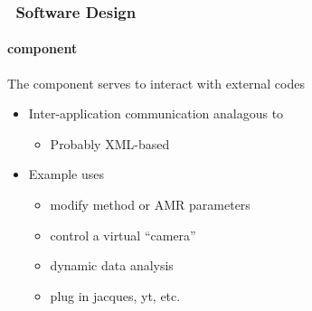 \begin{frame}[fragile] 
\frametitle{\cello\ Software Design}
\framesubtitle{ component}
The  component serves to interact with external codes \\
\begin{itemize}
\item{} Inter-application communication analagous to 
\begin{itemize}
\item{}    Probably XML-based
\end{itemize}
\item{} Example uses
\begin{itemize}
\item{} modify method or AMR parameters
\item{} control a virtual ``camera''
\item{} dynamic data analysis
\item{} plug in jacques, yt, etc.
\end{itemize}
\end{itemize}
\end{frame}
%
%
%
